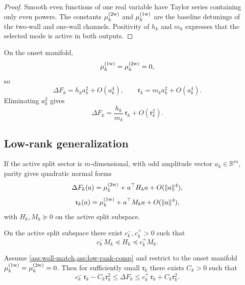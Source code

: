 \begin{proof}
Smooth even functions of one real variable have Taylor series containing only even powers.
The constants \(\mu_k^{(2{\rm w})}\) and \(\mu_k^{(1{\rm w})}\) are the baseline detunings of the two-wall and one-wall
channels. Positivity of \(h_k\) and \(m_k\) expresses that the selected mode is active in both outputs.
\end{proof}

\begin{corollary}
\label{cor:rank-one-wall-match}
On the onset manifold,
\[
\mu_k^{(1{\rm w})}=\mu_k^{(2{\rm w})}=0,
\]
so
\[
\Delta F_k=h_k a_k^2+O(a_k^4),
\qquad
\mathfrak r_k=m_k a_k^2+O(a_k^4).
\]
Eliminating \(a_k^2\) gives
\begin{equation}
\Delta F_k
=
\frac{h_k}{m_k}\,\mathfrak r_k+O(\mathfrak r_k^2).
\label{eq:rank-one-wall-match}
\end{equation}
\end{corollary}

\subsection{Low-rank generalization}
\label{subsec:alpha-derived}

If the active split sector is \(m\)-dimensional, with odd amplitude vector \(a_k\in\mathbb R^m\), parity gives quadratic
normal forms
\begin{equation}
\Delta F_k(a)
=
\mu_k^{(2{\rm w})}+a^\top H_k a+O(\|a\|^4),
\label{eq:DeltaF-lowrank}
\end{equation}
\begin{equation}
\mathfrak r_k(a)
=
\mu_k^{(1{\rm w})}+a^\top M_k a+O(\|a\|^4),
\label{eq:rres-lowrank}
\end{equation}
with \(H_k,M_k\succeq 0\) on the active split subspace.

\begin{assumption}
\label{ass:low-rank-comp}
On the active split subspace there exist \(c_k^-,c_k^+>0\) such that
\[
c_k^- M_k \preceq H_k \preceq c_k^+ M_k.
\]
\end{assumption}

\begin{proposition}
\label{prop:low-rank-wall-match}
Assume \cref{ass:wall-match,ass:low-rank-comp} and restrict to the onset manifold
\(\mu_k^{(1{\rm w})}=\mu_k^{(2{\rm w})}=0\).
Then for sufficiently small \(\mathfrak r_k\) there exists \(C_k>0\) such that
\begin{equation}
c_k^-\,\mathfrak r_k-C_k\mathfrak r_k^2
\le
\Delta F_k
\le
c_k^+\,\mathfrak r_k+C_k\mathfrak r_k^2.
\label{eq:low-rank-wall-match}
\end{equation}
\end{proposition}

